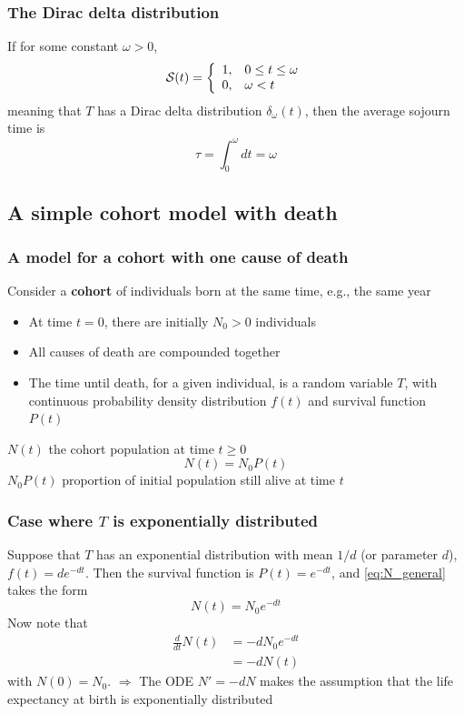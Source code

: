 \documentclass[aspectratio=43]{beamer}
\begin{document}
\begin{frame}\frametitle{The Dirac delta distribution}
If for some constant $\omega>0$,
\[
\S(t)=
\left\{
\begin{array}{ll}
1, & 0\leq t\leq\omega \\
0, & \omega<t
\end{array}
\right.
\]
meaning that $T$ has a Dirac delta distribution
$\delta_\omega(t)$, then the average sojourn time is
\[
\tau=\int_0^\omega dt=\omega
\]
\end{frame}


\subsection{A simple cohort model with death} 

\begin{frame}\frametitle{A model for a cohort with one cause of death}
Consider a \textbf{cohort} of individuals born at the same time, e.g., the same year
\vfill
\begin{itemize}
\item At time $t=0$, there are initially $N_0>0$ individuals
\item All causes of death are compounded together 
\item The time until death, for a given individual, is a random variable $T$, with continuous probability density distribution $f(t)$ and survival function $P(t)$
\end{itemize}
\vfill
$N(t)$ the cohort population at time $t\geq 0$
\begin{equation}\label{eq:N_general}
N(t)=N_0P(t)
\end{equation}
\vfill
$N_0P(t)$ proportion of initial population still alive at time $t$
\end{frame}

\begin{frame}\frametitle{Case where $T$ is exponentially distributed}
Suppose that $T$ has an exponential distribution with mean $1/d$ (or parameter $d$), $f(t)=de^{-dt}$. Then the survival function is $P(t)=e^{-dt}$, and \eqref{eq:N_general} takes the form
\begin{equation}\label{eq:N}
N(t)=N_0e^{-dt}
\end{equation}
\vfill
Now note that
\begin{align*}
\frac{d}{dt} N(t) &= -dN_0e^{-dt} \\
&= -dN(t)
\end{align*}
with $N(0)=N_0$.
\vfill
{\red $\Rightarrow$} The ODE $N'=-dN$ makes the assumption that the life expectancy at birth is exponentially distributed
\end{frame}
\end{document}
